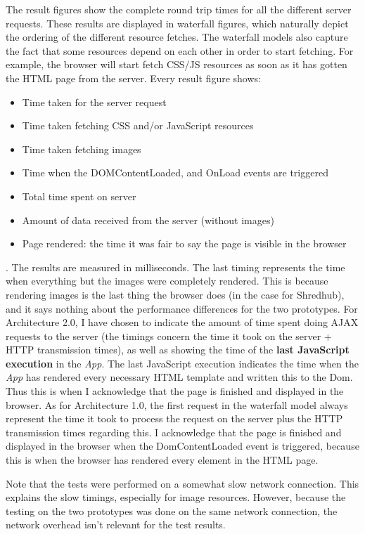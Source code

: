 The result figures show the complete round trip times for all the different server requests. These results are displayed in waterfall figures, which naturally depict the ordering of the different resource fetches. The waterfall models also capture the fact that some resources depend on each other in order to start fetching. For example, the browser will start fetch CSS/JS resources as soon as it has gotten the HTML page from the server. Every result figure shows:
\begin{itemize}
\item{} Time taken for the server request
\item{} Time taken fetching CSS and/or JavaScript resources
\item{} Time taken fetching images
\item{} Time when the DOMContentLoaded, and OnLoad events are triggered
\item{} Total time spent on server
\item{} Amount of data received from the server (without images)
\item{} Page rendered:  the time it was fair to say the page is visible in the browser
\end{itemize}. 
The results are measured in milliseconds. The last timing represents the time when everything but the images were completely rendered. This is because rendering images is the last thing the browser does (in the case for Shredhub), and it says nothing about the performance differences for the two prototypes. For Architecture 2.0, I have chosen to indicate the amount of time spent doing AJAX requests to the server (the timings concern the time it took on the server + HTTP transmission times), as well as showing the time of the \textbf{last JavaScript execution} in the \textit{App}. The last JavaScript execution indicates the time when the \textit{App} has rendered every necessary HTML template and written this to the Dom. Thus this is when I acknowledge that the page is finished and displayed in the browser. As for Architecture 1.0, the first request in the waterfall model always represent the time it took to process the request on the server plus the HTTP transmission times regarding this. I acknowledge that the page is finished and displayed in the browser when the DomContentLoaded event is triggered, because this is when the browser has rendered every element in the HTML page. 

 Note that the tests were performed on a somewhat slow network connection. This explains the slow timings, especially for image resources. However, because the testing on the two prototypes was done on the same network connection, the network overhead isn't relevant for the test results. 

